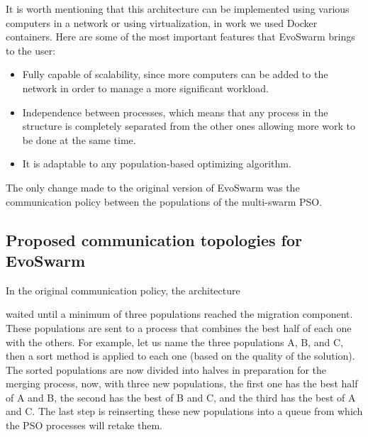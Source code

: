 \documentclass[runningheads]{llncs}
\begin{document}


It is worth mentioning that this architecture can be implemented using various
computers in a network or using virtualization, in work we used Docker containers. 
Here are some of the most important features that
EvoSwarm brings to the user:

\begin{itemize} 
  
  \item Fully capable of scalability, since more computers can be added to the
  network in order to manage a more significant workload.
    
    \item Independence between processes, which means that any process in the
    structure is completely separated from the other ones allowing more work to
    be done at the same time.
    
    \item It is adaptable to any population-based optimizing algorithm.
\end{itemize}

The only change made to the original version of EvoSwarm \cite{b18} was the
communication policy between the populations of the multi-swarm PSO. %

\subsection{Proposed communication topologies for EvoSwarm}

In the original communication policy, the architecture %

waited until a minimum of
three populations reached the migration component. %
These populations are sent to
a process that combines the best half of each one with the others. For example,
let us name the three populations A, B, and C, then a sort method is applied to
each one (based on the quality of the solution). The sorted populations are now
divided into halves in preparation for the merging process, now, with three new
populations, the first one has the best half of A and B, the second has the best
of B and C, and the third has the best of A and C. The last step is reinserting
these new populations into a queue from which the PSO processes will retake
them.
\end{document}
